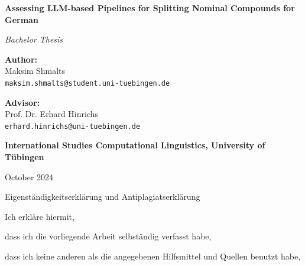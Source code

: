 \documentclass[11pt]{article}
\begin{document}



\begin{titlepage}

    \centering
    \vspace*{2cm}

    {\huge \textbf{Assessing LLM-based Pipelines for Splitting Nominal Compounds for German}}

    \vspace{1.5cm}
    {\Large \textit{Bachelor Thesis}}

    \vspace{2cm}
    
    \textbf{Author:}\\
    Maksim Shmalts \\
    \texttt{maksim.shmalts@student.uni-tuebingen.de}

    \vspace{1cm}
    
    \textbf{Advisor:}\\
    Prof. Dr. Erhard Hinrichs \\
    \texttt{erhard.hinrichs@uni-tuebingen.de}

    \vfill
    
    {\Large \textbf{International Studies Computational Linguistics, University of T{\"u}bingen}}

    \vspace{0.5cm}

    \vspace{2cm}
    October 2024

    \newpage
    \thispagestyle{empty}

    \vspace*{2cm}

    {\Large Eigenständigkeitserklärung und Antiplagiatserklärung}

    \vspace{1.5cm}

    \begin{flushleft}

        \large{
            Ich erkläre hiermit,
            
            dass ich die vorliegende Arbeit selbständig verfasst habe,
        
            dass ich keine anderen als die angegebenen Hilfsmittel und Quellen benutzt habe,
        
}
\end{flushleft}
\end{titlepage}
\end{document}
